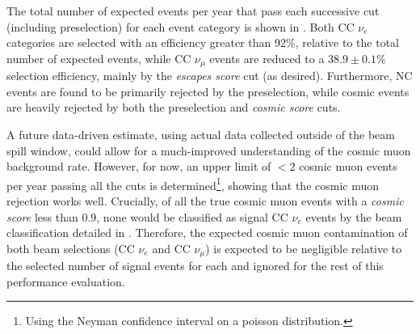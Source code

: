 The total number of expected events per year that pass each successive cut (including
preselection) for each event category is shown in . Both CC $\nu_{e}$
categories are selected with an efficiency greater than 92\%, relative to the total number of
expected events, while CC $\nu_{\mu}$ events are reduced to a $38.9\pm0.1\%$ selection efficiency,
mainly by the \emph{escapes score} cut (as desired). Furthermore, NC events are found to be
primarily rejected by the preselection, while cosmic events are heavily rejected by both the
preselection and \emph{cosmic score} cuts.

A future data-driven estimate, using actual \chipsfive data collected outside of the \numi beam
spill window, could allow for a much-improved understanding of the cosmic muon background rate.
However, for now, an upper limit of $<2$ cosmic muon events per year passing all the cuts is
determined\footnote{Using the Neyman confidence interval on a poisson distribution.}, showing that
the cosmic muon rejection works well. Crucially, of all the true cosmic muon events with a
\emph{cosmic score} less than $0.9$, none would be classified as signal CC $\nu_{e}$ events by the
beam classification detailed in . Therefore, the expected cosmic
muon contamination of both beam selections (CC $\nu_{e}$ and  CC $\nu_{\mu}$) is expected to be
negligible relative to the selected number of signal events for each and ignored for the rest of
this performance evaluation.

